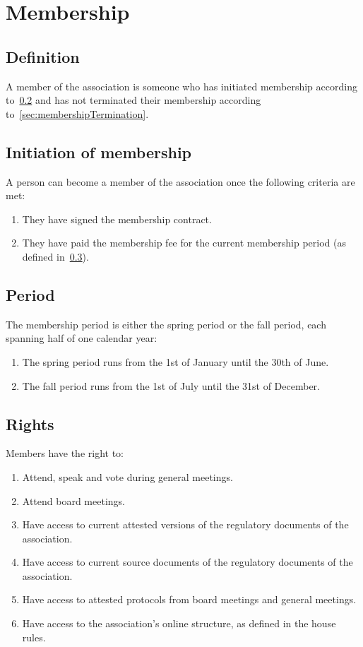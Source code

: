 \section*{Membership}
\subsection{Definition}
A member of the association is someone who has initiated membership according to~\ref{sec:membershipInitiation} 
and has not terminated their membership according to~\ref{sec:membershipTermination}.

\subsection{Initiation of membership}\label{sec:membershipInitiation}
A person can become a member of the association once the following criteria are met:
\begin{enumerate}
  \item They have signed the membership contract. %
  \item They have paid the membership fee for the current membership period (as defined in~\ref{sec:membershipPeriod}).
\end{enumerate}

\subsection{Period} \label{sec:membershipPeriod}
The membership period is either the spring period or the fall period, each spanning half of one calendar year:

\begin{enumerate}
  \item The spring period runs from the 1st of January until the 30th of June.
  \item The fall period runs from the 1st of July until the 31st of December.
\end{enumerate}

\subsection{Rights}
Members have the right to: 
\begin{enumerate}
  \item Attend, speak and vote during general meetings.
  \item Attend board meetings.
  \item Have access to current attested versions of the regulatory documents of the association.
  \item Have access to current source documents of the regulatory documents of the association.
  \item Have access to attested protocols from board meetings and general meetings.
  \item Have access to the association's online structure, as defined in the house rules.
\end{enumerate}

